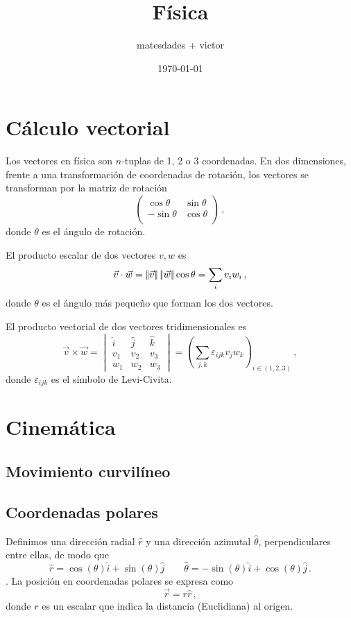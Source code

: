 \documentclass{article}
\title{Física}
\author{matesdades + victor}
\date{\today}
\newcommand{\norm}[1]%
{\ensuremath\left\vert{\!\!}\left\vert#1\right\vert{\!\!}\right\vert}
\begin{document}
\maketitle

\section{Cálculo vectorial}
Los vectores en física son $n$-tuplas de 1, 2 o 3 coordenadas. En dos 
dimensiones, frente a una transformación de coordenadas de rotación, los 
vectores se transforman por la matriz de rotación
\[
	\begin{pmatrix}
		\cos \theta & \sin \theta \\
		-\sin \theta & \cos \theta \\
	\end{pmatrix}\,,
\]
donde $\theta$ es el ángulo de rotación.

El producto escalar de dos vectores $v,w$ es
\[
	\vec{v}\cdot \vec{w} = \norm{\vec{v}}\norm{\vec{w}} \cos \theta = \sum_{i} 
	v_iw_i\,,
\]
donde $\theta$ es el ángulo más pequeño que forman los dos vectores.

El producto vectorial de dos vectores tridimensionales es
\[
	\vec{v}\times\vec{w} =
	\begin{vmatrix}
		\hat{i} & \hat{j} & \hat{k}\\
		v_1 & v_2 & v_3\\
		w_1 & w_2 & w_3
	\end{vmatrix}
	 = \left(\sum_{j,k}^{} \varepsilon_{ijk}v_jw_k\right)_{i\in(1,2,3)}\,,
\]
donde $\varepsilon_{ijk}$ es el símbolo de Levi-Civita.

\section{Cinemática}

\subsection{Movimiento curvilíneo}
\subsection{Coordenadas polares}
Definimos una dirección radial $\hat{r}$ y una dirección azimutal 
$\hat{\theta}$, perpendiculares entre ellas, de modo que
\[
	\hat{r} = \cos (\theta) \hat{i} + \sin (\theta)\hat{j} \qquad
	\hat{\theta} = -\sin (\theta) \hat{i} + \cos(\theta) \hat{j}\,.
\]. La posición en coordenadas polares 
se expresa como
\[
	\vec{r} = r\hat{r}\,,
\]
donde $r$ es un escalar que indica la distancia (Euclidiana) al origen.
\end{document}

